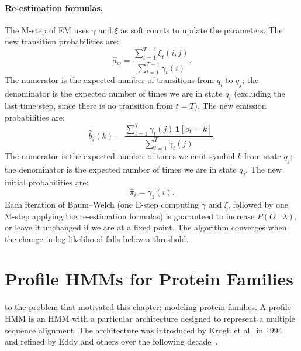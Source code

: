\paragraph{Re-estimation formulas.}
The M-step of EM uses $\gamma$ and $\xi$ as soft counts to update the parameters.
The new transition probabilities are:
\begin{equation}
\label{eq:reestimate-a}
  \hat{a}_{ij} = \frac{\sum_{t=1}^{T-1} \xi_t(i, j)}{\sum_{t=1}^{T-1} \gamma_t(i)}.
\end{equation}
The numerator is the expected number of transitions from $q_i$ to $q_j$; the denominator is the expected number of times we are in state $q_i$ (excluding the last time step, since there is no transition from $t = T$).
The new emission probabilities are:
\begin{equation}
\label{eq:reestimate-b}
  \hat{b}_j(k) = \frac{\sum_{t=1}^{T} \gamma_t(j) \, \mathbf{1}[o_t = k]}{\sum_{t=1}^{T} \gamma_t(j)}.
\end{equation}
The numerator is the expected number of times we emit symbol $k$ from state $q_j$; the denominator is the expected number of times we are in state $q_j$.
The new initial probabilities are:
\begin{equation}
\label{eq:reestimate-pi}
  \hat{\pi}_i = \gamma_1(i).
\end{equation}
Each iteration of Baum--Welch (one E-step computing $\gamma$ and $\xi$, followed by one M-step applying the re-estimation formulas) is guaranteed to increase $P(O \mid \lambda)$, or leave it unchanged if we are at a fixed point.
The algorithm converges when the change in log-likelihood falls below a threshold.


\section{Profile HMMs for Protein Families}
\label{sec:profile-hmm}

 to the problem that motivated this chapter: modeling protein families.
A profile HMM is an HMM with a particular architecture designed to represent a multiple sequence alignment.
The architecture was introduced by Krogh et al.\ in 1994~\cite{krogh1994} and refined by Eddy and others over the following decade~\cite{durbin1998}.

